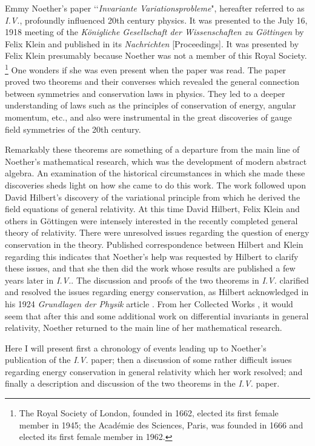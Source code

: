 \documentclass[12pt]{article}
\begin{document}
 
Emmy Noether's paper \lq\lq{\it{Invariante Variationsprobleme}}"\cite{noet},
hereafter referred to as {\it{I.V.}}, profoundly influenced 20th century
physics.  It was presented to the July 16, 1918 meeting of the
{\it{K\"{o}nigliche Gesellschaft der Wissenschaften zu G\"{o}ttingen}} by Felix 
Klein and published in its {\it{Nachrichten}} [Proceedings]. It was presented by 
 Felix Klein  presumably because
Noether was not a member of this Royal Society.
{\footnote{The Royal Society of London, founded in 1662, elected its first
female member in 1945; the Acad\'{e}mie des Sciences, Paris, was founded in
1666 and elected its first female member in 1962.}} One wonders if she was even
present when the paper was read.  The paper proved two theorems and their
converses which revealed the general connection between symmetries and
conservation laws in physics.  They led to a deeper understanding of laws such
as the principles of conservation of energy, angular momentum, etc., and also
were instrumental in the great discoveries of gauge field symmetries of the 20th
century.\cite{byers}

Remarkably these theorems are something of a departure from the main line of Noether's
mathematical research, which was the development of modern abstract algebra.  An examination
of the historical circumstances in which she made these discoveries sheds light on how she came to do this work.
  The work  followed upon David Hilbert's discovery
of the variational principle from which he derived
  the field equations of
general relativity.  
At this time 
 David Hilbert, Felix Klein and others in G\"{o}ttingen were intensely  interested in the recently  completed general theory of relativity. There were
unresolved issues regarding the question of energy conservation in the theory.
Published correspondence \cite{klein} 
between Hilbert and Klein regarding this indicates that   Noether's help was requested by Hilbert to clarify these
issues, and that she
then did the work whose results are published a few years later in {\it{I.V.}}. 
The discussion and proofs of  the two theorems  in {\it{I.V.}} clarified and
resolved the issues regarding energy conservation, as Hilbert acknowledged
in his 1924 {\it{Grundlagen der Physik}} article \cite{hilbert1}. From her Collected Works \cite{publist}, it would
seem that after this and some additional work on
differential invariants in general relativity\cite{paper1}, Noether returned to the main line
of her mathematical research.

Here I will present first a chronology of events leading up to Noether's publication of the
{\it{I.V.}} paper;  then a discussion of some rather difficult issues regarding
energy conservation in general relativity which her work resolved; and finally a
description and discussion of the two theorems in the {\it{I.V.}} paper.
\end{document}
